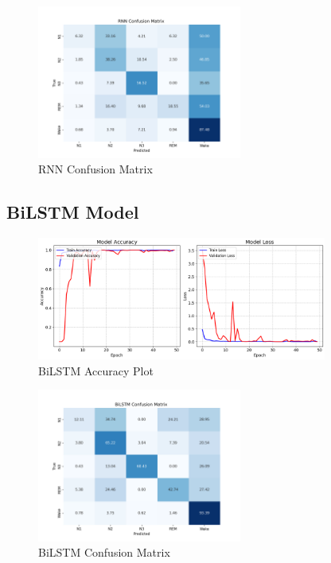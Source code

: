 \begin{figure}[H]
	\centering
	\includegraphics[width=0.6\textwidth]{img/paper_2/RNN_cm.png}
	\caption{RNN Confusion Matrix}
	\label{fig:rnn_cm}
\end{figure}

\subsection{BiLSTM Model}

\begin{figure}[H]
	\centering
	\includegraphics[width=0.85\textwidth]{img/paper_2/BILSTM Accuaracy Plot.png}
	\caption{BiLSTM Accuracy Plot}
	\label{fig:bilstm_accuracy}
\end{figure}

\begin{figure}[H]
	\centering
	\includegraphics[width=0.6\textwidth]{img/paper_2/BiLSTM_cm.png}
	\caption{BiLSTM Confusion Matrix}
	\label{fig:bilstm_cm}
\end{figure}

